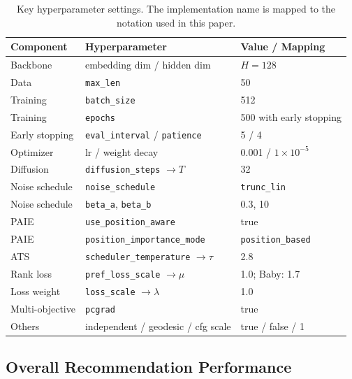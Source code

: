 \documentclass[runningheads,a4paper]{llncs}
\begin{document}
\begin{table}[tbp]
    \centering
    \caption{Key hyperparameter settings. The implementation name is mapped to the notation used in this paper.}
    \label{tab:hyperparams}
    \scriptsize
    \setlength{\tabcolsep}{3pt}
    \renewcommand{\arraystretch}{1.08}
    \begin{tabular}{p{}p{}p{}}
        \toprule
        Component & Hyperparameter & Value / Mapping \\
        \midrule
        Backbone & embedding dim / hidden dim & $H=128$ \\
        Data & \texttt{max\_len} & 50 \\
        Training & \texttt{batch\_size} & 512 \\
        Training & \texttt{epochs} & 500 with early stopping \\
        Early stopping & \texttt{eval\_interval} / \texttt{patience} & 5 / 4 \\
        Optimizer & lr / weight decay & 0.001 / $1\times 10^{-5}$ \\
        Diffusion & \texttt{diffusion\_steps} $\rightarrow T$ & 32 \\
        Noise schedule & \texttt{noise\_schedule} & \texttt{trunc\_lin} \\
        Noise schedule & \texttt{beta\_a}, \texttt{beta\_b} & 0.3, 10 \\
        PAIE & \texttt{use\_position\_aware} & true \\
        PAIE & \texttt{position\_importance\_mode} & \texttt{position\_based} \\
        ATS & \texttt{scheduler\_temperature} $\rightarrow \tau$ & 2.8 \\
        Rank loss & \texttt{pref\_loss\_scale} $\rightarrow \mu$ & 1.0; Baby: 1.7 \\
        Loss weight & \texttt{loss\_scale} $\rightarrow \lambda$ & 1.0 \\
        Multi-objective & \texttt{pcgrad} & true \\
        Others & independent / geodesic / cfg scale & true / false / 1 \\
        \bottomrule
    \end{tabular}
    \normalsize
\end{table}

\subsection{Overall Recommendation Performance}
\label{subsec:overall}
\end{document}
